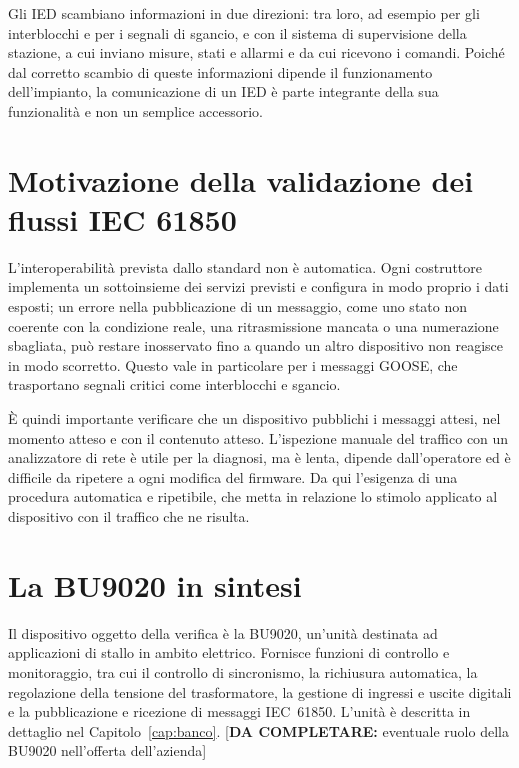 \documentclass[11pt,a4paper,italian,oneside,openany]{book}
\newcommand{\daf}[1]{{\color{red}[\textbf{DA COMPLETARE:} #1]}}
\begin{document}
Gli IED scambiano informazioni in due direzioni: tra loro, ad esempio per gli interblocchi e per i segnali di sgancio, e con il sistema di supervisione della stazione, a cui inviano misure, stati e allarmi e da cui ricevono i comandi. Poiché dal corretto scambio di queste informazioni dipende il funzionamento dell'impianto, la comunicazione di un IED è parte integrante della sua funzionalità e non un semplice accessorio.

\section{Motivazione della validazione dei flussi IEC 61850}
L'interoperabilità prevista dallo standard non è automatica. Ogni costruttore implementa un sottoinsieme dei servizi previsti e configura in modo proprio i dati esposti; un errore nella pubblicazione di un messaggio, come uno stato non coerente con la condizione reale, una ritrasmissione mancata o una numerazione sbagliata, può restare inosservato fino a quando un altro dispositivo non reagisce in modo scorretto. Questo vale in particolare per i messaggi GOOSE, che trasportano segnali critici come interblocchi e sgancio.

È quindi importante verificare che un dispositivo pubblichi i messaggi attesi, nel momento atteso e con il contenuto atteso. L'ispezione manuale del traffico con un analizzatore di rete è utile per la diagnosi, ma è lenta, dipende dall'operatore ed è difficile da ripetere a ogni modifica del firmware. Da qui l'esigenza di una procedura automatica e ripetibile, che metta in relazione lo stimolo applicato al dispositivo con il traffico che ne risulta.

\section{La BU9020 in sintesi}
Il dispositivo oggetto della verifica è la BU9020, un'unità destinata ad applicazioni di stallo in ambito elettrico. Fornisce funzioni di controllo e monitoraggio, tra cui il controllo di sincronismo, la richiusura automatica, la regolazione della tensione del trasformatore, la gestione di ingressi e uscite digitali e la pubblicazione e ricezione di messaggi IEC~61850. L'unità è descritta in dettaglio nel Capitolo~\ref{cap:banco}. \daf{eventuale ruolo della BU9020 nell'offerta dell'azienda}
\end{document}
